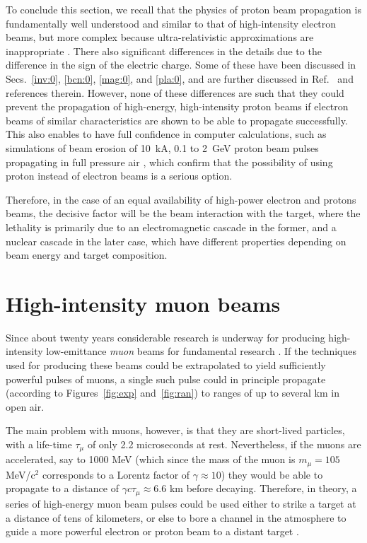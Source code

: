 \documentclass [12pt,a4paper,     ]{report} %
\begin{document}
  To conclude this section, we recall that the physics of proton beam propagation is fundamentally well understood and similar to that of high-intensity electron beams, but more complex because ultra-relativistic approximations are inappropriate \cite{LAMPE1987-}.  There also significant differences in the details due to the difference in the sign of the electric charge.  Some of these have been discussed in Secs.~\ref{inv:0}, \ref{bcn:0}, \ref{mag:0}, and \ref{pla:0}, and are further discussed in Ref.~\cite{OTTIN2000-} and references therein.  However, none of these differences are such that they could prevent the propagation of high-energy, high-intensity proton beams if electron beams of similar characteristics are shown to be able to propagate successfully.  This also enables to have full confidence in computer calculations, such as simulations of beam erosion of 10~kA, 0.1 to 2~GeV proton beam pulses propagating in full pressure air \cite{ROSE-2002-}, which confirm that the possibility of using proton instead of electron beams is a serious option.

  Therefore, in the case of an equal availability of high-power electron and protons beams, the decisive factor will be the beam interaction with the target, where the lethality is primarily due to an electromagnetic cascade in the former, and a nuclear cascade in the later case, which have different properties depending on beam energy and target composition.



\section{High-intensity muon beams}
\label{him:0}


Since about twenty years considerable research is underway for producing high-intensity low-emittance \emph{muon} beams for fundamental research \cite{NEUFF1999-}.  If the techniques used for producing these beams could be extrapolated to yield sufficiently powerful pulses of muons, a single such pulse could in principle propagate (according to Figures~\ref{fig:exp} and~\ref{fig:ran}) to ranges of up to several km in open air. 

   The main problem with muons, however, is that they are short-lived particles, with a life-time $\tau_{\mu}$ of only 2.2 microseconds at rest.  Nevertheless, if the muons are accelerated, say to 1000 MeV (which since the mass of the muon is $m_{\mu} = 105$ MeV/c$^2$ corresponds to a Lorentz factor of $\gamma \approx 10$) they would be able to propagate to a distance of $\gamma c \tau_{\mu} \approx 6.6$ km before decaying.  Therefore, in theory, a series of high-energy muon beam pulses could be used either to strike a target at a distance of tens of kilometers, or else to bore a channel in the atmosphere to guide a more powerful electron or proton beam to a distant target \cite{GSPON1987B}.
\end{document}
